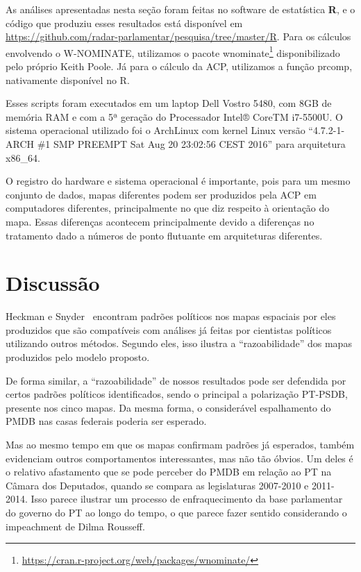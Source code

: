 \documentclass[a4paper, 12pt]{article}
\newcommand\wnominate{W-NOMINATE\xspace}
\begin{document}
As análises apresentadas nesta seção foram feitas no software de estatística \textbf{R}, e o código que produziu esses resultados está disponível em \url{https://github.com/radar-parlamentar/pesquisa/tree/master/R}. Para os cálculos envolvendo o \wnominate, utilizamos o pacote \textsf{wnominate}\footnote{\url{https://cran.r-project.org/web/packages/wnominate/}} disponibilizado pelo próprio Keith Poole. Já para o cálculo da ACP, utilizamos a função \textsf{prcomp}, nativamente disponível no R.

Esses scripts foram executados em um laptop Dell Vostro 5480, com 8GB de memória RAM e com a 5ª geração do Processador Intel® CoreTM i7-5500U. O sistema operacional utilizado foi o ArchLinux com kernel Linux  versão ``4.7.2-1-ARCH \#1 SMP PREEMPT Sat Aug 20 23:02:56 CEST 2016'' para arquitetura x86\_64. 

O registro do hardware e sistema operacional é importante, pois para um mesmo conjunto de dados, mapas diferentes podem ser produzidos pela ACP em computadores diferentes, principalmente no que diz respeito à orientação do mapa. Essas diferenças acontecem principalmente devido a diferenças no tratamento dado a números de ponto flutuante em arquiteturas diferentes.

\section{Discussão}
\label{sec:discussao}

Heckman e Snyder~\cite{heckman-snyder1997} encontram padrões políticos nos mapas espaciais por eles produzidos que são compatíveis com análises já feitas por cientistas políticos utilizando outros métodos. Segundo eles, isso ilustra a ``razoabilidade'' dos mapas produzidos pelo modelo proposto. 

De forma similar, a ``razoabilidade'' de nossos resultados pode ser defendida por certos padrões políticos identificados, sendo o principal a polarização PT-PSDB, presente nos cinco mapas. Da mesma forma, o considerável espalhamento do PMDB nas casas federais poderia ser esperado.

Mas ao mesmo tempo em que os mapas confirmam padrões já esperados, também evidenciam outros comportamentos interessantes, mas não tão óbvios. Um deles é o relativo afastamento que se pode perceber do PMDB em relação ao PT na Câmara dos Deputados, quando se compara as legislaturas 2007-2010 e 2011-2014. Isso parece ilustrar um processo de enfraquecimento da base parlamentar do governo do PT ao longo do tempo, o que parece fazer sentido considerando o impeachment de Dilma Rousseff.
\end{document}
